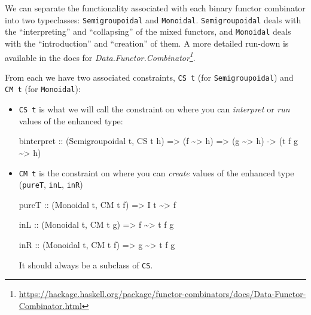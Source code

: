 \documentclass[]{article}
\newenvironment{Shaded}{}{}
\newcommand{\DataTypeTok}[1]{\textcolor[rgb]{0.56,0.13,0.00}{#1}}
\newcommand{\NormalTok}[1]{#1}
\newcommand{\OperatorTok}[1]{\textcolor[rgb]{0.40,0.40,0.40}{#1}}
\newcommand{\OtherTok}[1]{\textcolor[rgb]{0.00,0.44,0.13}{#1}}
\renewcommand{\href}[2]{#2\footnote{\url{#1}}}
\begin{document}
We can separate the functionality associated with each binary functor combinator
into two typeclasses: \texttt{Semigroupoidal} and \texttt{Monoidal}.
\texttt{Semigroupoidal} deals with the ``interpreting'' and ``collapsing'' of
the mixed functors, and \texttt{Monoidal} deals with the ``introduction'' and
``creation'' of them. A more detailed run-down is available in the docs for
\emph{\href{https://hackage.haskell.org/package/functor-combinators/docs/Data-Functor-Combinator.html}{Data.Functor.Combinator}}.

From each we have two associated constraints, \texttt{CS\ t} (for
\texttt{Semigroupoidal}) and \texttt{CM\ t} (for \texttt{Monoidal}):

\begin{itemize}
\item
  \texttt{CS\ t} is what we will call the constraint on where you can
  \emph{interpret} or \emph{run} values of the enhanced type:

\begin{Shaded}
\begin{Highlighting}[]
\NormalTok{binterpret}
\OtherTok{    ::}\NormalTok{ (}\DataTypeTok{Semigroupoidal}\NormalTok{ t, }\DataTypeTok{CS}\NormalTok{ t h)}
    \OtherTok{=>}\NormalTok{ (f }\OperatorTok{\textasciitilde{}>}\NormalTok{ h)}
    \OtherTok{=>}\NormalTok{ (g }\OperatorTok{\textasciitilde{}>}\NormalTok{ h)}
    \OtherTok{{-}>}\NormalTok{ (t f g }\OperatorTok{\textasciitilde{}>}\NormalTok{ h)}
\end{Highlighting}
\end{Shaded}
\item
  \texttt{CM\ t} is the constraint on where you can \emph{create} values of the
  enhanced type (\texttt{pureT}, \texttt{inL}, \texttt{inR})

\begin{Shaded}
\begin{Highlighting}[]
\NormalTok{pureT}
\OtherTok{    ::}\NormalTok{ (}\DataTypeTok{Monoidal}\NormalTok{ t, }\DataTypeTok{CM}\NormalTok{ t f)}
    \OtherTok{=>} \DataTypeTok{I}\NormalTok{ t }\OperatorTok{\textasciitilde{}>}\NormalTok{ f}

\OtherTok{inL ::}\NormalTok{ (}\DataTypeTok{Monoidal}\NormalTok{ t, }\DataTypeTok{CM}\NormalTok{ t g)}
    \OtherTok{=>}\NormalTok{ f }\OperatorTok{\textasciitilde{}>}\NormalTok{ t f g}

\OtherTok{inR ::}\NormalTok{ (}\DataTypeTok{Monoidal}\NormalTok{ t, }\DataTypeTok{CM}\NormalTok{ t f)}
    \OtherTok{=>}\NormalTok{ g }\OperatorTok{\textasciitilde{}>}\NormalTok{ t f g}
\end{Highlighting}
\end{Shaded}

  It should always be a subclass of \texttt{CS}.
\end{itemize}
\end{document}
